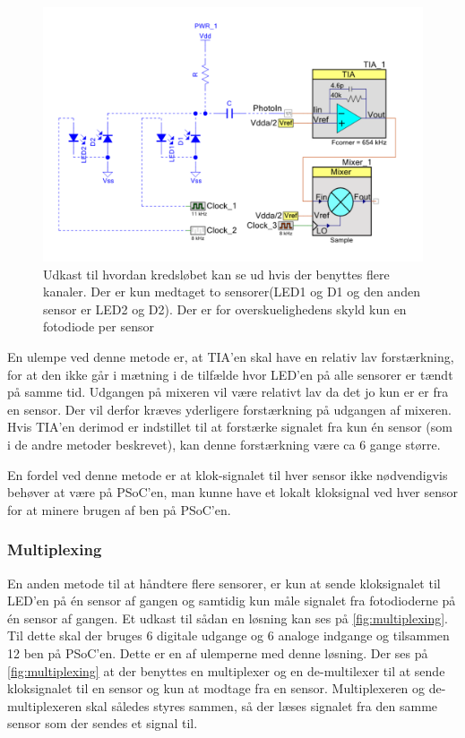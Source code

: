 \documentclass[HardwareDesign/HardwareDesign_main.tex]{subfiles}
\begin{document}
\begin{figure}[H]
    \centering
    \includegraphics[width=1\textwidth]{HardwareDesign/CupSensor/graphics/Flere_kanaler.PNG}
    \caption{Udkast til hvordan kredsløbet kan se ud hvis der benyttes flere kanaler. Der er kun medtaget to sensorer(LED1 og D1 og den anden sensor er LED2 og D2). Der er for overskuelighedens skyld kun en fotodiode per sensor}
    \label{fig:multiple_channels}
\end{figure}

 En ulempe ved denne metode er, at TIA'en skal have en relativ lav forstærkning, for at den ikke går i mætning i de tilfælde hvor LED'en på alle sensorer er tændt på samme tid. Udgangen på mixeren vil være relativt lav da det jo kun er er fra en sensor. Der vil derfor kræves yderligere forstærkning på udgangen af mixeren. Hvis TIA'en derimod er indstillet til at forstærke signalet fra kun én sensor (som i de andre metoder beskrevet), kan denne forstærkning være ca 6 gange større.
 
 En fordel ved denne metode er at klok-signalet til hver sensor ikke nødvendigvis behøver at være på PSoC'en, man kunne have et lokalt kloksignal ved hver sensor for at minere brugen af ben på PSoC'en.

\subsubsection{Multiplexing}
En anden metode til at håndtere flere sensorer, er kun at sende kloksignalet til LED'en på én sensor af gangen og samtidig kun måle signalet fra fotodioderne på én sensor af gangen. Et udkast til sådan en løsning kan ses på \ref{fig:multiplexing}. Til dette skal der bruges 6 digitale udgange og 6 analoge indgange og tilsammen 12 ben på PSoC'en. Dette er en af ulemperne med denne løsning. Der ses på \ref{fig:multiplexing} at der benyttes en multiplexer og en de-multilexer til at sende kloksignalet til en sensor og kun at modtage fra en sensor. Multiplexeren og de-multiplexeren skal således styres sammen, så der læses signalet fra den samme sensor som der sendes et signal til.
\end{document}
